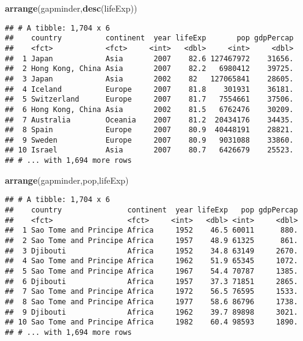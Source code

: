 \documentclass[]{article}
\newenvironment{Shaded}{\begin{snugshade}}{\end{snugshade}}
\newcommand{\KeywordTok}[1]{\textcolor[rgb]{0.13,0.29,0.53}{\textbf{#1}}}
\newcommand{\NormalTok}[1]{#1}
\begin{document}
\begin{Shaded}
\begin{Highlighting}[]
\KeywordTok{arrange}\NormalTok{(gapminder,}\KeywordTok{desc}\NormalTok{(lifeExp))}
\end{Highlighting}
\end{Shaded}

\begin{verbatim}
## # A tibble: 1,704 x 6
##    country          continent  year lifeExp       pop gdpPercap
##    <fct>            <fct>     <int>   <dbl>     <int>     <dbl>
##  1 Japan            Asia       2007    82.6 127467972    31656.
##  2 Hong Kong, China Asia       2007    82.2   6980412    39725.
##  3 Japan            Asia       2002    82   127065841    28605.
##  4 Iceland          Europe     2007    81.8    301931    36181.
##  5 Switzerland      Europe     2007    81.7   7554661    37506.
##  6 Hong Kong, China Asia       2002    81.5   6762476    30209.
##  7 Australia        Oceania    2007    81.2  20434176    34435.
##  8 Spain            Europe     2007    80.9  40448191    28821.
##  9 Sweden           Europe     2007    80.9   9031088    33860.
## 10 Israel           Asia       2007    80.7   6426679    25523.
## # ... with 1,694 more rows
\end{verbatim}

\begin{Shaded}
\begin{Highlighting}[]
\KeywordTok{arrange}\NormalTok{(gapminder,pop,lifeExp)}
\end{Highlighting}
\end{Shaded}

\begin{verbatim}
## # A tibble: 1,704 x 6
##    country               continent  year lifeExp   pop gdpPercap
##    <fct>                 <fct>     <int>   <dbl> <int>     <dbl>
##  1 Sao Tome and Principe Africa     1952    46.5 60011      880.
##  2 Sao Tome and Principe Africa     1957    48.9 61325      861.
##  3 Djibouti              Africa     1952    34.8 63149     2670.
##  4 Sao Tome and Principe Africa     1962    51.9 65345     1072.
##  5 Sao Tome and Principe Africa     1967    54.4 70787     1385.
##  6 Djibouti              Africa     1957    37.3 71851     2865.
##  7 Sao Tome and Principe Africa     1972    56.5 76595     1533.
##  8 Sao Tome and Principe Africa     1977    58.6 86796     1738.
##  9 Djibouti              Africa     1962    39.7 89898     3021.
## 10 Sao Tome and Principe Africa     1982    60.4 98593     1890.
## # ... with 1,694 more rows
\end{verbatim}
\end{document}
